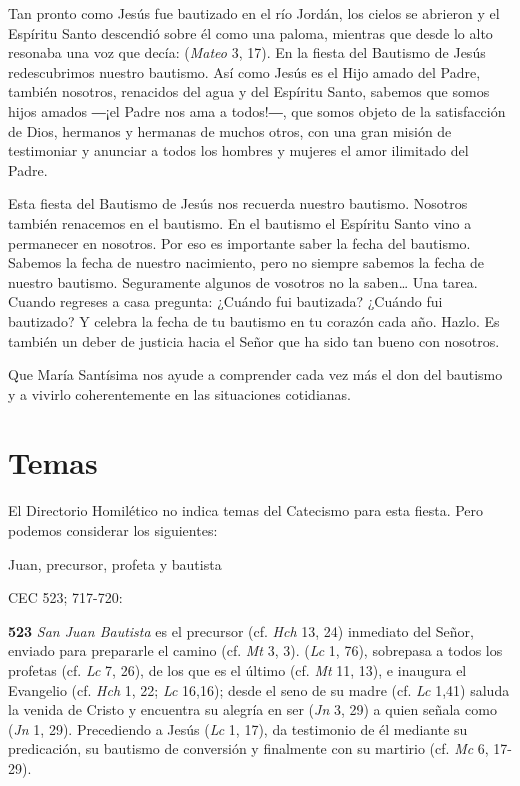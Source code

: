 {Tan pronto como Jesús fue bautizado en el río Jordán, los cielos se abrieron y el Espíritu Santo descendió sobre él como una paloma, mientras que desde lo alto resonaba una voz que decía:  (\emph{Mateo} 3, 17). En la fiesta del Bautismo de Jesús redescubrimos nuestro bautismo. Así como Jesús es el Hijo amado del Padre, también nosotros, renacidos del agua y del Espíritu Santo, sabemos que somos hijos amados ―¡el Padre nos ama a todos!―, que somos objeto de la satisfacción de Dios, hermanos y hermanas de muchos otros, con una gran misión de testimoniar y anunciar a todos los hombres y mujeres el amor ilimitado del Padre.

Esta fiesta del Bautismo de Jesús nos recuerda nuestro bautismo. Nosotros también renacemos en el bautismo. En el bautismo el Espíritu Santo vino a permanecer en nosotros. Por eso es importante saber la fecha del bautismo. Sabemos la fecha de nuestro nacimiento, pero no siempre sabemos la fecha de nuestro bautismo. Seguramente algunos de vosotros no la saben\ldots{} Una tarea. Cuando regreses a casa pregunta: ¿Cuándo fui bautizada? ¿Cuándo fui bautizado? Y celebra la fecha de tu bautismo en tu corazón cada año. Hazlo. Es también un deber de justicia hacia el Señor que ha sido tan bueno con nosotros.

Que María Santísima nos ayude a comprender cada vez más el don del bautismo y a vivirlo coherentemente en las situaciones cotidianas.

\section{Temas}

El Directorio Homilético no indica temas del Catecismo para esta fiesta. Pero podemos considerar los siguientes:

Juan, precursor, profeta y bautista

CEC 523; 717-720:

\textbf{523} \emph{San Juan Bautista} es el precursor (cf. \emph{Hch} 13, 24) inmediato del Señor, enviado para prepararle el camino (cf. \emph{Mt} 3, 3).  (\emph{Lc} 1, 76), sobrepasa a todos los profetas (cf. \emph{Lc} 7, 26), de los que es el último (cf. \emph{Mt} 11, 13), e inaugura el Evangelio (cf. \emph{Hch} 1, 22; \emph{Lc} 16,16); desde el seno de su madre (cf. \emph{Lc} 1,41) saluda la venida de Cristo y encuentra su alegría en ser  (\emph{Jn} 3, 29) a quien señala como  (\emph{Jn} 1, 29). Precediendo a Jesús  (\emph{Lc} 1, 17), da testimonio de él mediante su predicación, su bautismo de conversión y finalmente con su martirio (cf. \emph{Mc} 6, 17-29).

}
